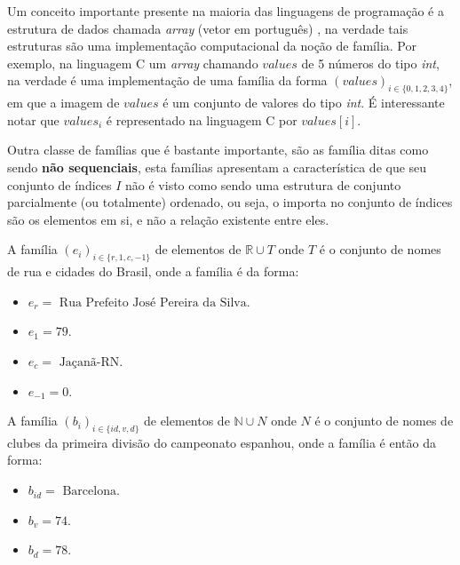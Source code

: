 \begin{nota}
	Um conceito importante presente na maioria das linguagens de programação é a estrutura de dados chamada \textit{array} (vetor em português) \cite{paulo2009algoritmos, medina2006, pythonOrg, jaime1994}, na verdade tais estruturas são uma implementação computacional da noção de família. Por exemplo, na linguagem C um \textit{array} chamando $values$ de 5 números do tipo \textit{int}, na verdade é uma implementação de uma família da forma $(values)_{i \in \{0,1, 2, 3, 4\}}$, em que a imagem de $values$ é um conjunto de valores do tipo \textit{int}. É interessante notar que $values_i$ é representado na linguagem C por $values[i]$.
\end{nota}

Outra classe de famílias que é bastante importante, são as família ditas como sendo \textbf{não sequenciais}, esta famílias apresentam a característica de que seu conjunto de índices $I$ não é visto como sendo uma estrutura de conjunto parcialmente (ou totalmente) ordenado, ou seja, o importa no conjunto de índices são os elementos em si, e não a relação existente entre eles. 

\begin{exemplo}\label{exe:Familia4}
	A família $(e_i)_{i \in \{r, 1, c, -1\}}$ de elementos de $\mathbb{R} \cup T$ onde $T$ é o conjunto de nomes de rua e cidades do Brasil, onde a família é da forma:
	\begin{itemize}
		\item $e_r = \text{ Rua Prefeito José Pereira da Silva}$.
		\item $e_1 = 79$.
		\item $e_c = \text{ Jaçanã-RN}$.
		\item $e_{-1} = 0$.
	\end{itemize}
\end{exemplo}

\begin{exemplo}\label{exe:Familia5}
	A família $(b_i)_{i \in \{id, v, d\}}$ de elementos de $\mathbb{N} \cup N$ onde $N$ é o conjunto de nomes de clubes da primeira divisão do campeonato espanhou, onde a família é então da forma:
	\begin{itemize}
		\item $b_{id} = \text{ Barcelona}$.
		\item $b_v = 74$.
		\item $b_d = 78$.
	\end{itemize}
\end{exemplo}

